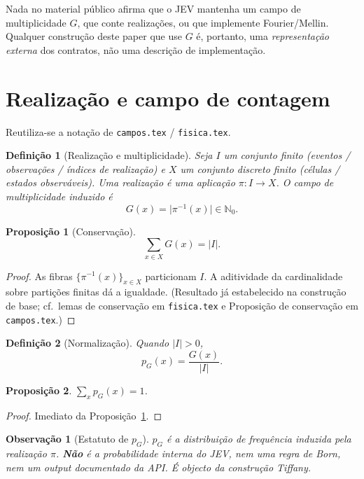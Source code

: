 \documentclass[11pt,a4paper]{article}
\newtheorem{definicao}{Definição}
\newtheorem{proposicao}{Proposição}
\newtheorem{observacao}{Observação}
\begin{document}
Nada no material público afirma que o JEV mantenha um campo de multiplicidade
\(G\), que conte realizações, ou que implemente Fourier/Mellin. Qualquer
construção deste paper que use \(G\) é, portanto, uma \emph{representação
externa} dos contratos, não uma descrição de implementação.

\section{Realização e campo de contagem}

Reutiliza-se a notação de \texttt{campos.tex} / \texttt{fisica.tex}.

\begin{definicao}[Realização e multiplicidade]
\label{def:realizacao}
Seja \(I\) um conjunto finito (eventos / observações / índices de realização)
e \(X\) um conjunto discreto finito (células / estados observáveis). Uma
realização é uma aplicação \(\pi\colon I\to X\). O campo de multiplicidade
induzido é
\[
G(x)=\lvert\pi^{-1}(x)\rvert\in\mathbb N_0.
\]
\end{definicao}

\begin{proposicao}[Conservação]
\label{prop:conservacao}
\[
\sum_{x\in X}G(x)=\lvert I\rvert.
\]
\end{proposicao}

\begin{proof}
As fibras \(\{\pi^{-1}(x)\}_{x\in X}\) particionam \(I\). A aditividade da
cardinalidade sobre partições finitas dá a igualdade. (Resultado já
estabelecido na construção de base; cf.\ lemas de conservação em
\texttt{fisica.tex} e Proposição de conservação em \texttt{campos.tex}.)
\end{proof}

\begin{definicao}[Normalização]
\label{def:pg}
Quando \(\lvert I\rvert>0\),
\[
p_G(x)=\frac{G(x)}{\lvert I\rvert}.
\]
\end{definicao}

\begin{proposicao}
\label{prop:pg-soma}
\(\sum_x p_G(x)=1\).
\end{proposicao}

\begin{proof}
Imediato da Proposição~\ref{prop:conservacao}.
\end{proof}

\begin{observacao}[Estatuto de \(p_G\)]
\label{obs:pg-nao-jev}
\(p_G\) é a distribuição de frequência induzida pela realização \(\pi\).
\textbf{Não} é a probabilidade interna do JEV, nem uma regra de Born, nem um
output documentado da API. É objecto da construção Tiffany.
\end{observacao}
\end{document}
